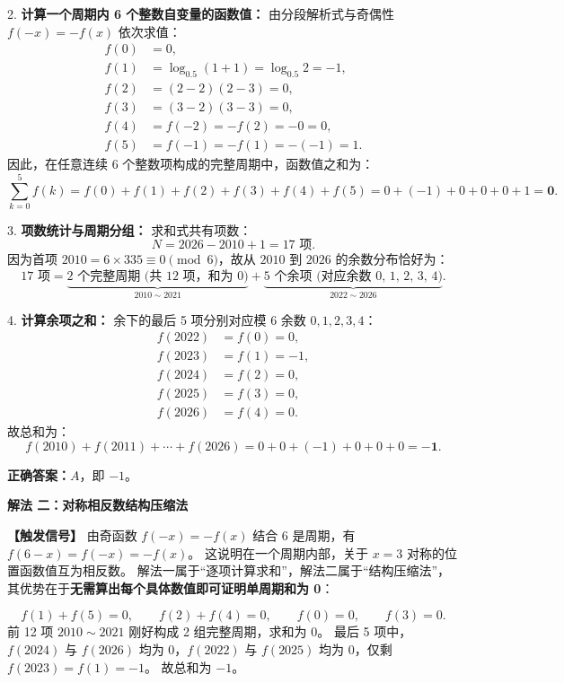 \documentclass[11pt,a4paper,fontset=fandol]{ctexart}
\newcommand{\method}[1]{\par\medskip\noindent\textbf{解法 #1}\par}
\begin{document}
2. \textbf{计算一个周期内 6 个整数自变量的函数值：}
由分段解析式与奇偶性 $f(-x) = -f(x)$ 依次求值：
\begin{align*}
f(0) &= 0,\\[0.3em]
f(1) &= \log_{0.5}(1 + 1) = \log_{0.5} 2 = -1,\\[0.3em]
f(2) &= (2 - 2)(2 - 3) = 0,\\[0.3em]
f(3) &= (3 - 2)(3 - 3) = 0,\\[0.3em]
f(4) &= f(-2) = -f(2) = -0 = 0,\\[0.3em]
f(5) &= f(-1) = -f(1) = -(-1) = 1.
\end{align*}
因此，在任意连续 6 个整数项构成的完整周期中，函数值之和为：
\[
\sum_{k=0}^{5} f(k) = f(0) + f(1) + f(2) + f(3) + f(4) + f(5) = 0 + (-1) + 0 + 0 + 0 + 1 = \mathbf{0}.
\]

3. \textbf{项数统计与周期分组：}
求和式共有项数：
\[
N = 2026 - 2010 + 1 = 17 \text{ 项}.
\]
因为首项 $2010 = 6 \times 335 \equiv 0 \pmod 6$，故从 $2010$ 到 $2026$ 的余数分布恰好为：
\[
17 \text{ 项} = \underbrace{2 \text{ 个完整周期 (共 12 项，和为 0)}}_{2010 \sim 2021} + \underbrace{5 \text{ 个余项 (对应余数 0, 1, 2, 3, 4)}}_{2022 \sim 2026}.
\]

4. \textbf{计算余项之和：}
余下的最后 5 项分别对应模 6 余数 $0, 1, 2, 3, 4$：
\begin{align*}
f(2022) &= f(0) = 0,\\[0.3em]
f(2023) &= f(1) = -1,\\[0.3em]
f(2024) &= f(2) = 0,\\[0.3em]
f(2025) &= f(3) = 0,\\[0.3em]
f(2026) &= f(4) = 0.
\end{align*}
故总和为：
\[
f(2010) + f(2011) + \cdots + f(2026) = 0 + 0 + (-1) + 0 + 0 + 0 = \mathbf{-1}.
\]

\begin{answerbox}
\textbf{正确答案：}\(\boxed{A}\)，即 \(\boxed{-1}\)。
\end{answerbox}

\method{二：对称相反数结构压缩法}

\noindent\textbf{【触发信号】}
由奇函数 $f(-x) = -f(x)$ 结合 6 是周期，有 $f(6-x) = f(-x) = -f(x)$。
这说明在一个周期内部，关于 $x=3$ 对称的位置函数值互为相反数。
解法一属于“逐项计算求和”，解法二属于“结构压缩法”，其优势在于\textbf{无需算出每个具体数值即可证明单周期和为 0}：

\[
f(1) + f(5) = 0, \qquad f(2) + f(4) = 0, \qquad f(0) = 0, \qquad f(3) = 0.
\]
前 12 项 $2010 \sim 2021$ 刚好构成 2 组完整周期，求和为 0。
最后 5 项中，$f(2024)$ 与 $f(2026)$ 均为 0，$f(2022)$ 与 $f(2025)$ 均为 0，仅剩 $f(2023) = f(1) = -1$。
故总和为 $-1$。
\end{document}
